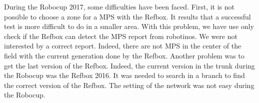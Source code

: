 During the Robocup 2017, some difficulties have been faced. First, it is not possible to choose a zone for a MPS with the Refbox. It results that a successful test is more difficult to do in a smaller area. With this problem, we have use only check if the Refbox can detect the MPS report from robotinos. We were not interested by a correct report. Indeed, there are not MPS in the center of the field with the current generation done by the Refbox. Another problem was to get the last version of the Refbox. Indeed, the current version in the trunk during the Robocup was the Refbox 2016. It was needed to search in a branch to find the correct version of the Refbox. The setting of the network was not easy during the Robocup.

